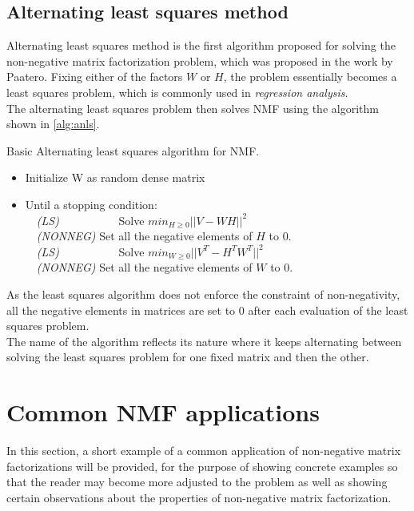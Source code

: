 \documentclass[thesis=M,english]{FITthesis}[2012/10/20]
\begin{document}
\subsection{Alternating least squares method}
Alternating least squares method is the first algorithm proposed for solving
the non-negative matrix factorization problem, which was proposed in the
work by Paatero. \cite{nmf-paatero} Fixing either of the factors $W$ or $H$,
the problem essentially becomes a least squares problem, which is commonly
used in \emph{regression analysis}.
\\

The alternating least squares problem then solves NMF using the algorithm
shown in \ref{alg:anls}.
\\

\begin{algorithm}[h]
  \caption{Basic Alternating least squares algorithm for NMF. \cite{nmf-anls}}
  \label{alg:anls}
  \begin{itemize}
    \item Initialize W as random dense matrix\\
    \item Until a stopping condition:\\
    ~~\emph{(LS)} ~~~~~~~~~~Solve $min_{H \geq 0}||V - WH||^{2}$\\
    ~~\emph{(NONNEG)} Set all the negative elements of $H$ to $0$.\\
    ~~\emph{(LS)} ~~~~~~~~~~Solve $min_{W \geq 0}||V^{T} - H^{T}W^{T}||^{2}$\\
    ~~\emph{(NONNEG)} Set all the negative elements of $W$ to $0$.\\
  \end{itemize}
\end{algorithm}

As the least squares algorithm does not enforce the constraint of non-negativity,
all the negative elements in matrices are set to $0$ after each evaluation of
the least squares problem.
\\

The name of the algorithm reflects its nature where it keeps alternating between
solving the least squares problem for one fixed matrix and then the other.


\section{Common NMF applications}
In this section, a short example of a common application of non-negative matrix
factorizations will be provided, for the purpose of showing concrete examples
so that the reader may become more adjusted to the problem as well as showing
certain observations about the properties of non-negative matrix factorization.
\\
\end{document}
